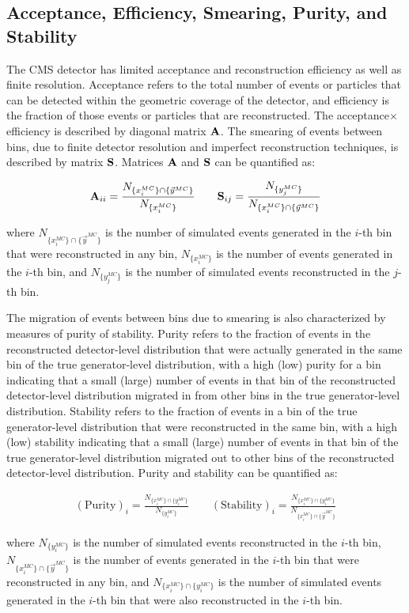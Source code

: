\begin{refsection}
\section{Acceptance, Efficiency, Smearing, Purity, and Stability}
The CMS detector has limited acceptance and reconstruction efficiency as well as finite resolution.
Acceptance refers to the total number of events or particles that can be detected within the geometric coverage of the detector, and efficiency is the fraction of those events or particles that are reconstructed.
The acceptance$\times$efficiency is described by diagonal matrix $\mathbf{A}$. 
The smearing of events between bins, due to finite detector resolution and imperfect reconstruction techniques, is described by matrix $\mathbf{S}$.
Matrices $\mathbf{A}$ and $\mathbf{S}$ can be quantified as:
\begin{linenomath*}
\begin{align}
\mathbf{A}_{ii} = \frac{N_{ \{ x_i^{MC} \} \cap \{ \vec{y}^{MC} \}}}{N_{ \{ x_i^{MC} \} }} \quad \quad
\mathbf{S}_{ij} = \frac{N_{ \{ y_j^{MC} \} }}{N_{ \{ x_i^{MC} \} \cap \{ \vec{y}^{MC} \}}}
\end{align}
\end{linenomath*}
where $N_{ \{ x_i^{MC} \} \cap \{ \vec{y}^{MC} \}}$ is the number of simulated events generated in the $i$-th bin that were reconstructed in any bin, $N_{ \{ x_i^{MC} \} }$ is the number of events generated in the $i$-th bin, and $N_{ \{ y_j^{MC} \} }$ is the number of simulated events reconstructed in the $j$-th bin.

The migration of events between bins due to smearing is also characterized by measures of purity of stability.
Purity refers to the fraction of events in the reconstructed detector-level distribution that were actually generated in the same bin of the true generator-level distribution, with a high (low) purity for a bin indicating that a small (large) number of events in that bin of the reconstructed detector-level distribution migrated in from other bins in the true generator-level distribution.
Stability refers to the fraction of events in a bin of the true generator-level distribution that were reconstructed in the same bin, with a high (low) stability indicating that a small (large) number of events in that bin of the true generator-level distribution migrated out to other bins of the reconstructed detector-level distribution.
Purity and stability can be quantified as:
\begin{linenomath*}
\begin{align}
(\text{Purity})_i = \frac{N_{ \{ x_i^{MC} \} \cap \{ y_i^{MC} \} }}{N_{ \{ y_i^{MC} \} }} \quad \quad
(\text{Stability})_i = \frac{N_{ \{ x_i^{MC} \} \cap \{ y_i^{MC} \} }}{N_{ \{ x_i^{MC} \} \cap \{ \vec{y}^{MC} \}}}
\end{align}
\end{linenomath*}
where $N_{ \{ y_i^{MC} \} }$ is the number of simulated events reconstructed in the $i$-th bin, $N_{ \{ x_i^{MC} \} \cap \{ \vec{y}^{MC} \}}$ is the number of events generated in the $i$-th bin that were reconstructed in any bin, and $N_{ \{ x_i^{MC} \} \cap \{ y_i^{MC} \} }$ is the number of simulated events generated in the $i$-th bin that were also reconstructed in the $i$-th bin.


\end{refsection}
